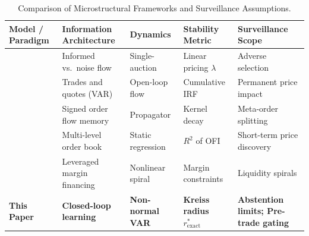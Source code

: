 \documentclass[12pt]{article}
\theoremstyle{definition}
\theoremstyle{remark}
\begin{document}
\begin{table}[htbp]
\centering\footnotesize
\caption{Comparison of Microstructural Frameworks and Surveillance Assumptions.}
\label{tab:lit_comparison}
\begin{tabularx}{\textwidth}{p{3.2cm}Xp{2.2cm}XX}\toprule
Model / Paradigm & Information Architecture & Dynamics & Stability Metric & Surveillance Scope \\\midrule
\citet{kyle1985continuous} & Informed vs.\ noise flow & Single-auction & Linear pricing $\lambda$ & Adverse selection \\
\citet{hasbrouck1991} & Trades and quotes (VAR) & Open-loop flow & Cumulative IRF & Permanent price impact \\
\citet{bouchaud2004fluctuations} & Signed order flow memory & Propagator & Kernel decay & Meta-order splitting \\
\citet{cont2014} & Multi-level order book & Static regression & $R^2$ of OFI & Short-term price discovery \\
\citet{brunnermeier2009} & Leveraged margin financing & Nonlinear spiral & Margin constraints & Liquidity spirals \\
\textbf{This Paper} & \textbf{Closed-loop learning} & \textbf{Non-normal VAR} & \textbf{Kreiss radius $r^*_{\text{exact}}$} & \textbf{Abstention limits; Pre-trade gating} \\\bottomrule
\end{tabularx}
\end{table}
\end{document}
